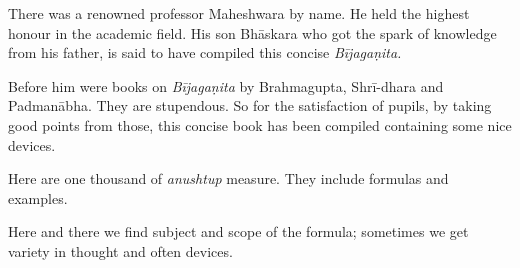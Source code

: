 \documentclass[]{article}
\begin{document}
\begin{quote}  {}  \end{quote}

There was a renowned professor Maheshwara by name. He held the highest
honour in the academic field. His son Bhāskara who got the spark of
knowledge from his father, is said to have compiled this concise
\textit{Bījagaṇita.}

\begin{quote}  {
}  \end{quote}

{Before him were books on \textit{Bījagaṇita} by Brahmagupta, Shrī-dhara
and Padmanābha. They are stupendous. So for the satisfaction of pupils, by
taking good points from those, this concise book has been compiled
containing some nice devices. }

\begin{quote}  {
}  \end{quote}

{Here \;are \;one \;thousand \;of \;\textit{anushtup} \;measure. They \;include formulas and
examples.}

\begin{quote}  {
}  \end{quote}

{Here and there we find subject and scope of the formula; sometimes we get
variety in thought and often devices.}

\begin{quote}  {
}  \end{quote}
\end{document}
